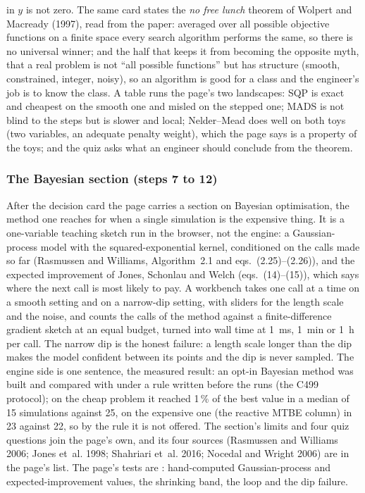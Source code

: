\documentclass[11pt,a4paper]{article}
\begin{document}
in $y$ is not zero.  The same card states the \emph{no free lunch} theorem of
Wolpert and Macready (1997), read from the paper: averaged over all possible
objective functions on a finite space every search algorithm performs the same,
so there is no universal winner; and the half that keeps it from becoming the
opposite myth, that a real problem is not ``all possible functions'' but has
structure (smooth, constrained, integer, noisy), so an algorithm is good for a
class and the engineer's job is to know the class.  A table runs the page's two
landscapes: SQP is exact and cheapest on the smooth one and misled on the
stepped one; MADS is not blind to the steps but is slower and local;
Nelder--Mead does well on both toys (two variables, an adequate penalty
weight), which the page says is a property of the toys; and the quiz asks what
an engineer should conclude from the theorem.

\subsubsection*{The Bayesian section (steps 7 to 12)}

After the decision card the page carries a section on Bayesian optimisation,
the method one reaches for when a single simulation is the expensive thing.
It is a one-variable teaching sketch run in the browser, not the engine: a
Gaussian-process model with the squared-exponential kernel, conditioned on the
calls made so far (Rasmussen and Williams, Algorithm~2.1 and
eqs.~(2.25)--(2.26)), and the expected improvement of Jones, Schonlau and Welch
(eqs.~(14)--(15)), which says where the next call is most likely to pay.  A
workbench takes one call at a time on a smooth setting and on a narrow-dip
setting, with sliders for the length scale and the noise, and counts the calls
of the method against a finite-difference gradient sketch at an equal budget,
turned into wall time at 1~ms, 1~min or 1~h per call.  The narrow dip is the
honest failure: a length scale longer than the dip makes the model confident
between its points and the dip is never sampled.  The engine side is one
sentence, the measured result: an opt-in Bayesian method was built and compared
with  under a rule written before the runs
(the C499 protocol); on the cheap problem it
reached 1\,\% of the best value in a median of 15 simulations against 25, on
the expensive one (the reactive MTBE column) in 23 against 22, so by the rule
it is not offered.  The section's limits and four quiz questions join the
page's own, and its four sources (Rasmussen and Williams 2006; Jones et~al.
1998; Shahriari et~al. 2016; Nocedal and Wright 2006) are in the page's list.
The page's tests are : hand-computed
Gaussian-process and expected-improvement values, the shrinking band, the loop
and the dip failure.
\end{document}
